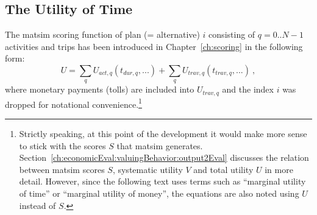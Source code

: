 \subsection{The Utility of Time}
\label{sec:scor-funct-revisited}
%
 
%
The \acrshort{matsim} scoring function of plan (= alternative) $i$ consisting of $q = 0..N-1$ activities and trips has been introduced in Chapter~\ref{ch:scoring} in the following form:\
\begin{equation}
U = \sum_q U_{act,q}(t_{dur,q}, ...) + \sum_q U_{trav,q}(t_{trav,q}, ...) 
%
\ ,
\label{eq:scoring-fct-revisited}
\end{equation}
where monetary payments (\eg tolls) are included into $U_{trav,q}$ and the index $i$ was dropped for notational convenience.\footnote{%
%
Strictly speaking, at this point of the development it would make more sense to stick with the scores $S$ that \gls{matsim} generates.  Section~\ref{ch:economicEval:valuingBehavior:output2Eval} discusses the relation between \gls{matsim} scores $S$, systematic utility $V$ and total utility $U$ in more detail.
However, since the following text uses terms such as ``marginal utility of time'' or ``marginal utility of money'', the equations are also noted using $U$ instead of $S$. \kai{chk}
%
}


